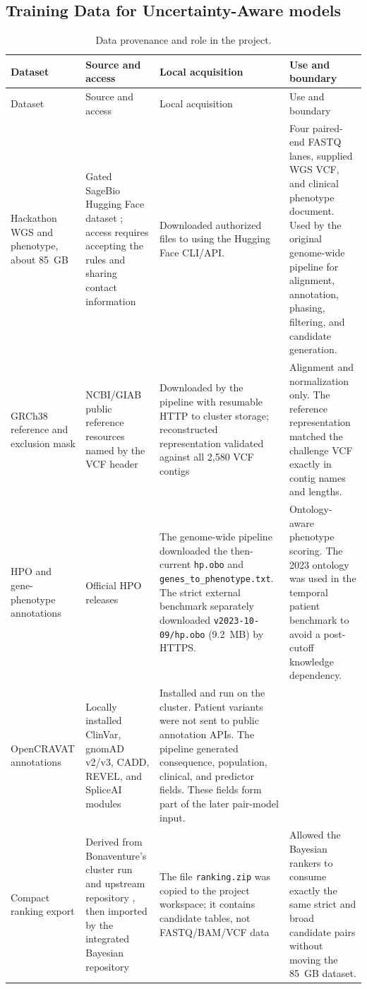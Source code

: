 \documentclass[11pt]{article}
\newcommand{\code}[1]{\texttt{#1}}
\begin{document}
\subsection{Training Data for Uncertainty-Aware models}

\footnotesize
\begin{longtable}{p{}p{}p{}p{}}
\caption{Data provenance and role in the project.}\\
\toprule
Dataset & Source and access & Local acquisition & Use and boundary \\
\midrule
\endfirsthead
\toprule
Dataset & Source and access & Local acquisition & Use and boundary \\
\midrule
\endhead
Hackathon WGS and phenotype, about 85~GB & Gated SageBio Hugging Face dataset \citep{hackathondata2026}; access requires accepting the rules and sharing contact information & Downloaded authorized files to using the Hugging Face CLI/API. & Four paired-end FASTQ lanes, supplied WGS VCF, and clinical phenotype document. Used by the original genome-wide pipeline for alignment, annotation, phasing, filtering, and candidate generation. \\
GRCh38 reference and exclusion mask & NCBI/GIAB public reference resources named by the VCF header & Downloaded by the pipeline with resumable HTTP to cluster storage; reconstructed representation validated against all 2,580 VCF contigs & Alignment and normalization only. The reference representation matched the challenge VCF exactly in contig names and lengths. \\
HPO and gene-phenotype annotations & Official HPO releases \citep{hpo2021} & The genome-wide pipeline downloaded the then-current \code{hp.obo} and \code{genes\_to\_phenotype.txt}. The strict external benchmark separately downloaded \code{v2023-10-09/hp.obo} (9.2~MB) by HTTPS. & Ontology-aware phenotype scoring. The 2023 ontology was used in the temporal patient benchmark to avoid a post-cutoff knowledge dependency. \\
OpenCRAVAT annotations & Locally installed ClinVar, gnomAD v2/v3, CADD, REVEL, and SpliceAI modules \citep{clinvar,gnomad2020,cadd2014,revel2016,spliceai2019} & Installed and run on the cluster. Patient variants were not sent to public annotation APIs. The pipeline generated consequence, population, clinical, and predictor fields. These fields form part of the later pair-model input. \\
Compact ranking export & Derived from Bonaventure's cluster run and upstream repository \citep{dossourepo2026}, then imported by the integrated Bayesian repository \citep{tourerepo2026} & The file \code{ranking.zip} was copied to the project workspace; it contains candidate tables, not FASTQ/BAM/VCF data & Allowed the Bayesian rankers to consume exactly the same strict and broad candidate pairs without moving the 85~GB dataset. \\

\end{longtable}
\end{document}
